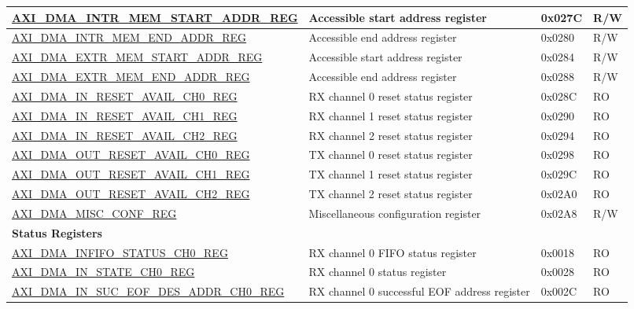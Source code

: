 \begin{longtable}{ | l | p{10cm} | p{1.3cm} | l | }
\hyperref[regdesc:AXIDMAINTRMEMSTARTADDRREG]{AXI\_DMA\_INTR\_MEM\_START\_ADDR\_REG} & Accessible start address register & 0x027C & R/W \\ \hline
\hyperref[regdesc:AXIDMAINTRMEMENDADDRREG]{AXI\_DMA\_INTR\_MEM\_END\_ADDR\_REG} & Accessible end address register & 0x0280 & R/W \\ \hline
\hyperref[regdesc:AXIDMAEXTRMEMSTARTADDRREG]{AXI\_DMA\_EXTR\_MEM\_START\_ADDR\_REG} & Accessible start address register & 0x0284 & R/W \\ \hline
\hyperref[regdesc:AXIDMAEXTRMEMENDADDRREG]{AXI\_DMA\_EXTR\_MEM\_END\_ADDR\_REG} & Accessible end address register & 0x0288 & R/W \\ \hline
\hyperref[regdesc:AXIDMAINRESETAVAILCHNREG]{AXI\_DMA\_IN\_RESET\_AVAIL\_CH0\_REG} & RX channel 0 reset status register & 0x028C & RO \\ \hline
\hyperref[regdesc:AXIDMAINRESETAVAILCHNREG]{AXI\_DMA\_IN\_RESET\_AVAIL\_CH1\_REG} & RX channel 1 reset status register & 0x0290 & RO \\ \hline
\hyperref[regdesc:AXIDMAINRESETAVAILCHNREG]{AXI\_DMA\_IN\_RESET\_AVAIL\_CH2\_REG} & RX channel 2 reset status register & 0x0294 & RO \\ \hline
\hyperref[regdesc:AXIDMAOUTRESETAVAILCHNREG]{AXI\_DMA\_OUT\_RESET\_AVAIL\_CH0\_REG} & TX channel 0 reset status register & 0x0298 & RO \\ \hline
\hyperref[regdesc:AXIDMAOUTRESETAVAILCHNREG]{AXI\_DMA\_OUT\_RESET\_AVAIL\_CH1\_REG} & TX channel 1 reset status register & 0x029C & RO \\ \hline
\hyperref[regdesc:AXIDMAOUTRESETAVAILCHNREG]{AXI\_DMA\_OUT\_RESET\_AVAIL\_CH2\_REG} & TX channel 2 reset status register & 0x02A0 & RO \\ \hline
\hyperref[regdesc:AXIDMAMISCCONFREG]{AXI\_DMA\_MISC\_CONF\_REG} & Miscellaneous configuration register & 0x02A8 & R/W \\ \hline
\multicolumn{4}{|l|}{\textbf{Status Registers}} \\ \hline
\hyperref[regdesc:AXIDMAINFIFOSTATUSCHNREG]{AXI\_DMA\_INFIFO\_STATUS\_CH0\_REG} & RX channel 0 FIFO status register & 0x0018 & RO \\ \hline
\hyperref[regdesc:AXIDMAINSTATECHNREG]{AXI\_DMA\_IN\_STATE\_CH0\_REG} & RX channel 0 status register & 0x0028 & RO \\ \hline
\hyperref[regdesc:AXIDMAINSUCEOFDESADDRCHNREG]{AXI\_DMA\_IN\_SUC\_EOF\_DES\_ADDR\_CH0\_REG} & RX channel 0 successful EOF address register & 0x002C & RO \\ \hline

\end{longtable}
